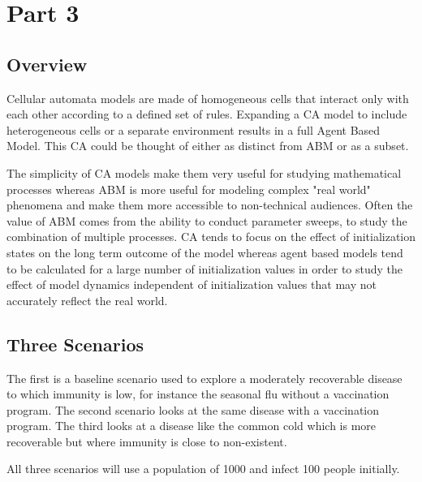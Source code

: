 \documentclass[11pt]{article} %
\begin{document}

\section{Part 3}

\subsection{Overview}

Cellular automata models are made of homogeneous cells that interact only with each other according to a defined set of rules. Expanding a CA model to include heterogeneous cells or a separate environment results in a full Agent Based Model. This CA could be thought of either as distinct from ABM or as a subset. 
 
The simplicity of CA models make them very useful for studying mathematical processes whereas ABM is more useful for modeling complex "real world" phenomena and make them more accessible to non-technical audiences. Often the value of ABM comes from the ability to conduct parameter sweeps, to study the combination of multiple processes. CA tends to focus on the effect of initialization states on the long term outcome of the model whereas agent based models tend to be calculated for a large number of initialization values in order to study the effect of model dynamics independent of initialization values that may not accurately reflect the real world. 

\subsection{Three Scenarios}

The first is a baseline scenario used to explore a moderately recoverable disease to which immunity is low, for instance the seasonal flu without a vaccination program. The second scenario looks at the same disease with a vaccination program. The third looks at a disease like the common cold which is more recoverable but where immunity is close to non-existent. 

All three scenarios will use a population of 1000 and infect 100 people initially. 
\end{document}
